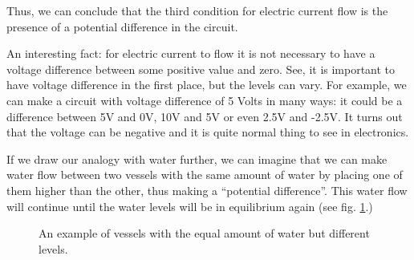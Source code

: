 \documentclass[../sparc.tex]{subfiles}
\begin{document}
Thus, we can conclude that the third condition for electric current flow is the
presence of a potential difference in the circuit.

An interesting fact: for electric current to flow it is not necessary to have a
voltage difference between some positive value and zero.  See, it is important
to have voltage difference in the first place, but the levels can vary.  For
example, we can make a circuit with voltage difference of 5 Volts in many ways:
it could be a difference between 5V and 0V, 10V and 5V or even 2.5V and -2.5V.
It turns out that the voltage can be negative and it is quite normal thing to
see in electronics.

If we draw our analogy with water further, we can imagine that we can make water
flow between two vessels with the same amount of water by placing one of them
higher than the other, thus making a ``potential difference''.  This water flow
will continue until the water levels will be in equilibrium again (see
fig. \ref{fig:electronics-circuits-3}.)

\begin{figure}[ht]
  \centering
  \caption{An example of vessels with the equal amount of water but different
    levels.}
  \label{fig:electronics-circuits-3}
\end{figure}
\end{document}
